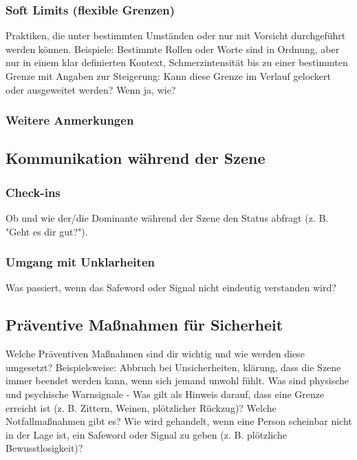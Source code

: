 \documentclass[a4paper,12pt]{article}
\begin{document}
\subsubsection{Soft Limits (flexible Grenzen)}
\noindent Praktiken, die unter bestimmten Umständen oder nur mit Vorsicht durchgeführt werden können. Beispiele: Bestimmte Rollen oder Worte sind in Ordnung, aber nur in einem klar definierten Kontext, Schmerzintensität bis zu einer bestimmten Grenze mit Angaben zur Steigerung: Kann diese Grenze im Verlauf gelockert oder ausgeweitet werden? Wenn ja, wie?\newline
\noindent \TextField[name=LimitsSoft,multiline=true,height=15em, width=37em]{}

\subsubsection{Weitere Anmerkungen}
\noindent \TextField[name=LimitsAnmerkungen,multiline=true,height=5em, width=37em]{}

\newpage
\subsection{Kommunikation während der Szene}
\subsubsection{Check-ins}
\noindent Ob und wie der/die Dominante während der Szene den Status abfragt (z. B. "Geht es dir gut?").\newline
\noindent \TextField[name=KommCheckIn,multiline=true,height=20em, width=37em]{}

\subsubsection{Umgang mit Unklarheiten}
\noindent Was passiert, wenn das Safeword oder Signal nicht eindeutig verstanden wird?\newline
\noindent \TextField[name=KommUnklar,multiline=true,height=20em, width=37em]{}

\newpage
\subsection{Präventive Maßnahmen für Sicherheit}
\noindent Welche Präventiven Maßnahmen sind dir wichtig und wie werden diese umgesetzt? Beispielsweise: Abbruch bei Unsicherheiten, klärung, dass die Szene immer beendet werden kann, wenn sich jemand unwohl fühlt. Was sind physische und psychische Warnsignale - Was gilt als Hinweis darauf, dass eine Grenze erreicht ist (z. B. Zittern, Weinen, plötzlicher Rückzug)? Welche Notfallmaßnahmen gibt es? Wie wird gehandelt, wenn eine Person scheinbar nicht in der Lage ist, ein Safeword oder Signal zu geben (z. B. plötzliche Bewusstlosigkeit)? \newline
\noindent \TextField[name=KommPreventSecure,multiline=true,height=40em, width=37em]{}
\end{document}
